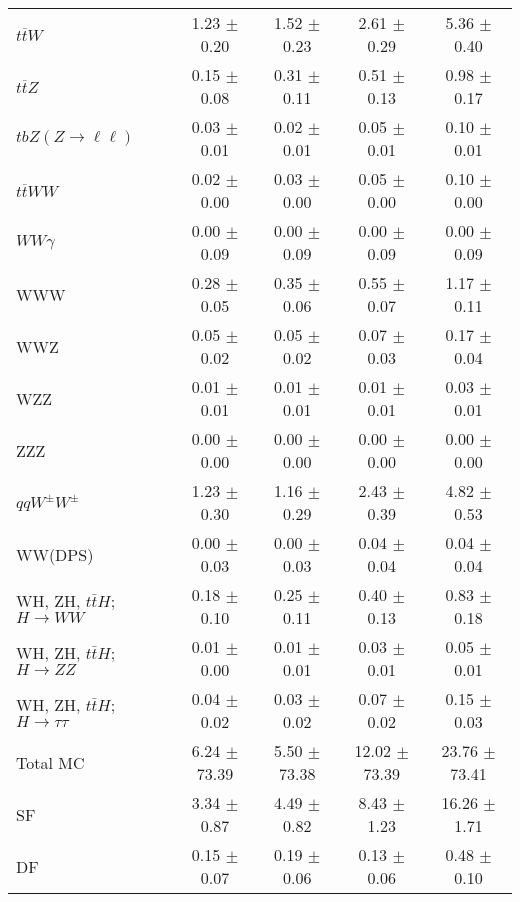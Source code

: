 \begin{tabular}{l|cccc}
                   $t\overline{t}W$ &  1.23 $\pm$  0.20 &  1.52 $\pm$  0.23 &  2.61 $\pm$  0.29 &  5.36 $\pm$  0.40 \\
                   $t\overline{t}Z$ &  0.15 $\pm$  0.08 &  0.31 $\pm$  0.11 &  0.51 $\pm$  0.13 &  0.98 $\pm$  0.17 \\
    $tbZ (Z \rightarrow \ell \ell)$ &  0.03 $\pm$  0.01 &  0.02 $\pm$  0.01 &  0.05 $\pm$  0.01 &  0.10 $\pm$  0.01 \\
                  $t\overline{t}WW$ &  0.02 $\pm$  0.00 &  0.03 $\pm$  0.00 &  0.05 $\pm$  0.00 &  0.10 $\pm$  0.00 \\
                         $WW\gamma$ &  0.00 $\pm$  0.09 &  0.00 $\pm$  0.09 &  0.00 $\pm$  0.09 &  0.00 $\pm$  0.09 \\
                                WWW &  0.28 $\pm$  0.05 &  0.35 $\pm$  0.06 &  0.55 $\pm$  0.07 &  1.17 $\pm$  0.11 \\
                                WWZ &  0.05 $\pm$  0.02 &  0.05 $\pm$  0.02 &  0.07 $\pm$  0.03 &  0.17 $\pm$  0.04 \\
                                WZZ &  0.01 $\pm$  0.01 &  0.01 $\pm$  0.01 &  0.01 $\pm$  0.01 &  0.03 $\pm$  0.01 \\
                                ZZZ &  0.00 $\pm$  0.00 &  0.00 $\pm$  0.00 &  0.00 $\pm$  0.00 &  0.00 $\pm$  0.00 \\
                 $qqW^{\pm}W^{\pm}$ &  1.23 $\pm$  0.30 &  1.16 $\pm$  0.29 &  2.43 $\pm$  0.39 &  4.82 $\pm$  0.53 \\
                            WW(DPS) &  0.00 $\pm$  0.03 &  0.00 $\pm$  0.03 &  0.04 $\pm$  0.04 &  0.04 $\pm$  0.04 \\
WH, ZH, $t\bar{t}H$; $H \rightarrow WW$ &  0.18 $\pm$  0.10 &  0.25 $\pm$  0.11 &  0.40 $\pm$  0.13 &  0.83 $\pm$  0.18 \\
WH, ZH, $t\bar{t}H$; $H \rightarrow ZZ$ &  0.01 $\pm$  0.00 &  0.01 $\pm$  0.01 &  0.03 $\pm$  0.01 &  0.05 $\pm$  0.01 \\
WH, ZH, $t\bar{t}H$; $H \rightarrow \tau\tau$ &  0.04 $\pm$  0.02 &  0.03 $\pm$  0.02 &  0.07 $\pm$  0.02 &  0.15 $\pm$  0.03 \\
\hline\hline
                           Total MC &  6.24 $\pm$ 73.39 &  5.50 $\pm$ 73.38 & 12.02 $\pm$ 73.39 & 23.76 $\pm$ 73.41 \\
\hline
                                 SF &  3.34 $\pm$  0.87 &  4.49 $\pm$  0.82 &  8.43 $\pm$  1.23 & 16.26 $\pm$  1.71 \\
                                 DF &  0.15 $\pm$  0.07 &  0.19 $\pm$  0.06 &  0.13 $\pm$  0.06 &  0.48 $\pm$  0.10 \\

\end{tabular}
